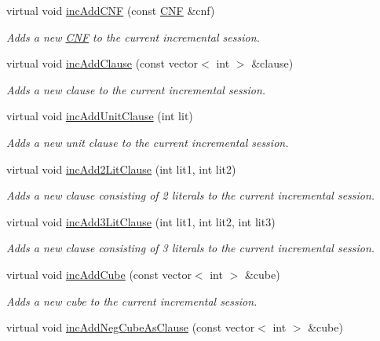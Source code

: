 \begin{DoxyCompactItemize}
virtual void \hyperlink{classMiniSatApi_ae5ffe2811e01051c5206c9e4865a7102}{inc\-Add\-C\-N\-F} (const \hyperlink{classCNF}{C\-N\-F} \&cnf)
\begin{DoxyCompactList}\small\item\em Adds a new \hyperlink{classCNF}{C\-N\-F} to the current incremental session. \end{DoxyCompactList}\item 
virtual void \hyperlink{classMiniSatApi_af2115a84419b7480ff55b747f7ddd60a}{inc\-Add\-Clause} (const vector$<$ int $>$ \&clause)
\begin{DoxyCompactList}\small\item\em Adds a new clause to the current incremental session. \end{DoxyCompactList}\item 
virtual void \hyperlink{classMiniSatApi_ade09bb38667bb23f2ac993e2d6c66408}{inc\-Add\-Unit\-Clause} (int lit)
\begin{DoxyCompactList}\small\item\em Adds a new unit clause to the current incremental session. \end{DoxyCompactList}\item 
virtual void \hyperlink{classMiniSatApi_a56c4758ee7466cd7fa48a682fee76fd3}{inc\-Add2\-Lit\-Clause} (int lit1, int lit2)
\begin{DoxyCompactList}\small\item\em Adds a new clause consisting of 2 literals to the current incremental session. \end{DoxyCompactList}\item 
virtual void \hyperlink{classMiniSatApi_aee9556c8c5de695fa5d7aa7cfde57877}{inc\-Add3\-Lit\-Clause} (int lit1, int lit2, int lit3)
\begin{DoxyCompactList}\small\item\em Adds a new clause consisting of 3 literals to the current incremental session. \end{DoxyCompactList}\item 
virtual void \hyperlink{classMiniSatApi_a41e16a2e8757846fa17e010c5cc1ff16}{inc\-Add\-Cube} (const vector$<$ int $>$ \&cube)
\begin{DoxyCompactList}\small\item\em Adds a new cube to the current incremental session. \end{DoxyCompactList}\item 
virtual void \hyperlink{classMiniSatApi_a49afe5c41bb036a31f65f98621e82846}{inc\-Add\-Neg\-Cube\-As\-Clause} (const vector$<$ int $>$ \&cube)

\end{DoxyCompactItemize}
